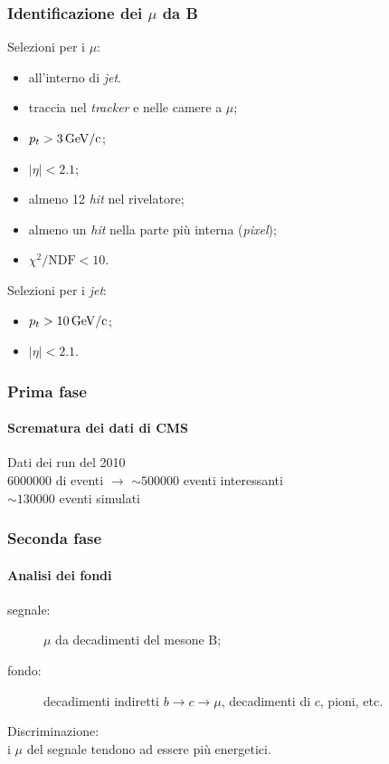 \documentclass[italian]{beamer}
\newcommand{\meson}[1]{\ensuremath{\mathrm{#1}}}
\begin{document}
\begin{frame}
    \frametitle{Identificazione dei $\mu$ da B}

    Selezioni per i $\mu$:
    \begin{itemize}
        \item all'interno di \emph{jet}.
        \item traccia nel \emph{tracker} e nelle camere a $\mu$;
        \item $p_t > \unit[3]{GeV/c}$;
        \item $|\eta| < 2.1$;
        \item almeno 12 \emph{hit} nel rivelatore;
        \item almeno un \emph{hit} nella parte più interna (\emph{pixel});
        \item $\chi^2 / \text{NDF} < 10$.
    \end{itemize}

    Selezioni per i \emph{jet}:
    \begin{itemize}
        \item $p_t > \unit[10]{GeV/c}$;
        \item $|\eta| < 2.1$.
    \end{itemize}
\end{frame}

\begin{frame}
    \frametitle{Prima fase}
    \framesubtitle{Scrematura dei dati di CMS}

    Dati dei run del 2010\\
    6000000 di eventi $\longrightarrow$ $\sim500000$ eventi interessanti
    \vspace{\baselineskip}\\
    $\sim130000$ eventi simulati
\end{frame}

\begin{frame}
    \frametitle{Seconda fase}
    \framesubtitle{Analisi dei fondi}

    \begin{description}
        \item[segnale: ]$\mu$ da decadimenti del mesone $\meson{B}$;
        \item[fondo: ] decadimenti indiretti $b \rightarrow c \rightarrow
            \mu$, decadimenti di $c$, pioni, etc.
    \end{description}

    Discriminazione:\\
    i $\mu$ del segnale tendono ad essere più energetici.
\end{frame}
\end{document}
